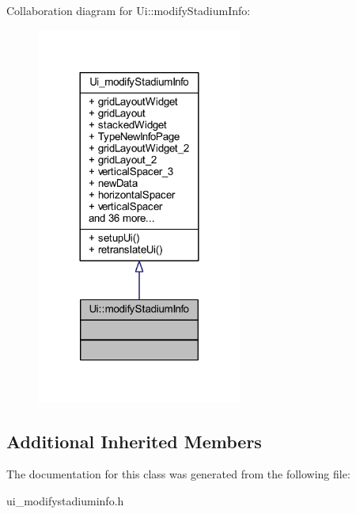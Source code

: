 Collaboration diagram for Ui\+:\+:modify\+Stadium\+Info\+:
\nopagebreak
\begin{figure}[H]
\begin{center}
\leavevmode
\includegraphics[width=192pt]{class_ui_1_1modify_stadium_info__coll__graph}
\end{center}
\end{figure}
\subsection*{Additional Inherited Members}


The documentation for this class was generated from the following file\+:\begin{DoxyCompactItemize}
\item 
ui\+\_\+modifystadiuminfo.\+h\end{DoxyCompactItemize}
